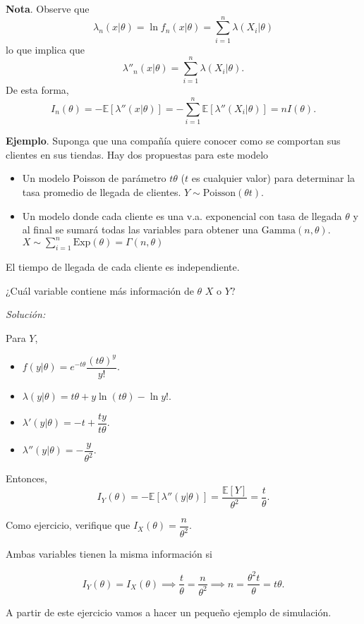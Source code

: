 \documentclass[
  12pt,
]{book}
\begin{document}
\textbf{Nota}. Observe que
\[\lambda_n(x|\theta) = \ln f_n(x|\theta) = \sum_{i=1}^{n} \lambda(X_i|\theta)\]
lo que implica que
\[\lambda''_n(x|\theta) = \sum_{i=1}^n\lambda(X_i|\theta).\]
De esta forma,
\[I_n(\theta) = -\mathbb E[\lambda''(x|\theta)] = - \sum_{i=1}^n\mathbb E[\lambda''(X_i|\theta)] = nI(\theta).\]

\textbf{Ejemplo}. Suponga que una compañía quiere conocer como se comportan sus clientes en sus tiendas. Hay dos propuestas para este modelo

\begin{itemize}
\item
  Un modelo Poisson de parámetro \(t\theta\) (\(t\) es cualquier valor) para determinar la tasa promedio de llegada de clientes. \(Y\sim \text{Poisson}(\theta t)\).
\item
  Un modelo donde cada cliente es una v.a. exponencial con tasa de llegada \(\theta\) y al final se sumará todas las variables para obtener una \(\mathrm{Gamma}(n,\theta)\). \(X\sim \sum_{i=1}^{n}\text{Exp}(\theta) = \Gamma(n,\theta)\)
\end{itemize}

El tiempo de llegada de cada cliente es independiente.

¿Cuál variable contiene más información de \(\theta\) \(X\) o \(Y\)?

\emph{Solución:}

Para \(Y\),

\begin{itemize}
\item
  \(f(y|\theta) = e^{-t\theta}\dfrac{(t\theta)^y}{y!}\).
\item
  \(\lambda(y|\theta) = t\theta + y\ln (t\theta) - \ln y!\).
\item
  \(\lambda'(y|\theta) = -t+\dfrac{ty}{t\theta}.\)
\item
  \(\lambda''(y|\theta) = -\dfrac y{\theta^2}\).
\end{itemize}

Entonces,
\[I_Y(\theta) =-\mathbb E[ \lambda''(y|\theta)] = \dfrac{\mathbb E[Y]}{\theta^2} = \dfrac{t}\theta.\]

Como ejercicio, verifique que \(I_X(\theta) = \dfrac n{\theta^2}\).

Ambas variables tienen la misma información si

\[I_Y(\theta) = I_X(\theta) \implies \dfrac t\theta = \dfrac n{\theta^2} \implies n = \dfrac{\theta^2 t}{\theta } =  t\theta.\]

A partir de este ejercicio vamos a hacer un pequeño ejemplo de simulación.
\end{document}
